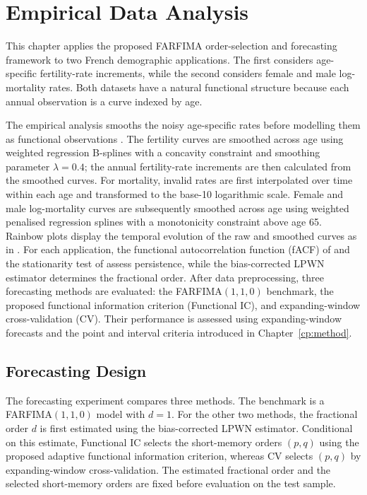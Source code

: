 \chapter[Empirical Data Analysis]{Empirical Data Analysis}
\label{cp:application}

This chapter applies the proposed FARFIMA order-selection and forecasting framework to two French demographic applications. The first considers age-specific fertility-rate increments, while the second considers female and male log-mortality rates. Both datasets have a natural functional structure because each annual observation is a curve indexed by age.

The empirical analysis smooths the noisy age-specific rates before modelling them as functional observations \citep{HU07,RH09}. The fertility curves are smoothed across age using weighted regression B-splines with a concavity constraint and smoothing parameter $\lambda=0.4$; the annual fertility-rate increments are then calculated from the smoothed curves. For mortality, invalid rates are first interpolated over time within each age and transformed to the base-10 logarithmic scale. Female and male log-mortality curves are subsequently smoothed across age using weighted penalised regression splines with a monotonicity constraint above age 65. Rainbow plots display the temporal evolution of the raw and smoothed curves as in \citet{YS25}. For each application, the functional autocorrelation function (fACF) of \citet{GJ21} and the stationarity test of \citet{LPG14} assess persistence, while the bias-corrected LPWN estimator determines the fractional order. After data preprocessing, three forecasting methods are evaluated: the FARFIMA$(1,1,0)$ benchmark, the proposed functional information criterion (Functional IC), and expanding-window cross-validation (CV). Their performance is assessed using expanding-window forecasts and the point and interval criteria introduced in Chapter~\ref{cp:method}.

\section{Forecasting Design}
\label{sec:emp-forecast-design}

The forecasting experiment compares three methods. The benchmark is a FARFIMA$(1,1,0)$ model with $d=1$. For the other two methods, the fractional order $d$ is first estimated using the bias-corrected LPWN estimator. Conditional on this estimate, Functional IC selects the short-memory orders $(p,q)$ using the proposed adaptive functional information criterion, whereas CV selects $(p,q)$ by expanding-window cross-validation. The estimated fractional order and the selected short-memory orders are fixed before evaluation on the test sample.


